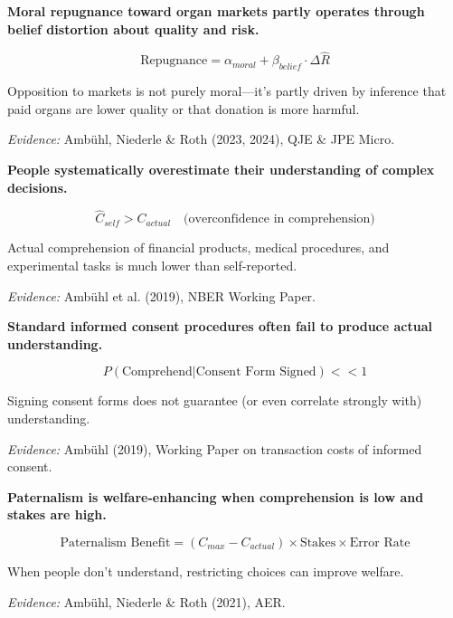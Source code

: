 \begin{tcolorbox}[colback=red!5!white,colframe=red!75!black,title=Axiom SA-2: Repugnance as Belief Channel]
\textbf{Moral repugnance toward organ markets partly operates through belief distortion about quality and risk.}

\begin{equation}
\text{Repugnance} = \alpha_{moral} + \beta_{belief} \cdot \Delta\hat{R}
\end{equation}

Opposition to markets is not purely moral---it's partly driven by inference that paid organs are lower quality or that donation is more harmful.

\textit{Evidence:} Ambühl, Niederle \& Roth (2023, 2024), QJE \& JPE Micro.
\end{tcolorbox}

\begin{tcolorbox}[colback=red!5!white,colframe=red!75!black,title=Axiom SA-3: Comprehension Deficit]
\textbf{People systematically overestimate their understanding of complex decisions.}

\begin{equation}
\hat{C}_{self} > C_{actual} \quad \text{(overconfidence in comprehension)}
\end{equation}

Actual comprehension of financial products, medical procedures, and experimental tasks is much lower than self-reported.

\textit{Evidence:} Ambühl et al. (2019), NBER Working Paper.
\end{tcolorbox}

\begin{tcolorbox}[colback=red!5!white,colframe=red!75!black,title=Axiom SA-4: Informed Consent Paradox]
\textbf{Standard informed consent procedures often fail to produce actual understanding.}

\begin{equation}
P(\text{Comprehend} | \text{Consent Form Signed}) << 1
\end{equation}

Signing consent forms does not guarantee (or even correlate strongly with) understanding.

\textit{Evidence:} Ambühl (2019), Working Paper on transaction costs of informed consent.
\end{tcolorbox}

\begin{tcolorbox}[colback=red!5!white,colframe=red!75!black,title=Axiom SA-5: Justified Paternalism Conditions]
\textbf{Paternalism is welfare-enhancing when comprehension is low and stakes are high.}

\begin{equation}
\text{Paternalism Benefit} = (C_{max} - C_{actual}) \times \text{Stakes} \times \text{Error Rate}
\end{equation}

When people don't understand, restricting choices can improve welfare.

\textit{Evidence:} Ambühl, Niederle \& Roth (2021), AER.
\end{tcolorbox}

